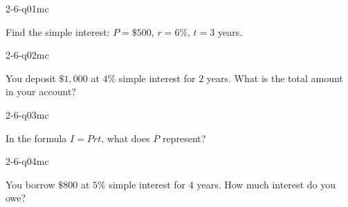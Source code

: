 

\begin{practiceQuestion}{2-6-q01}{mc}
\begin{questionText}
Find the simple interest: $P = \$500$, $r = 6\%$, $t = 3$ years.
\end{questionText}
\end{practiceQuestion}

\begin{practiceQuestion}{2-6-q02}{mc}
\begin{questionText}
You deposit $\$1{,}000$ at $4\%$ simple interest for $2$ years. What is the total amount in your account?
\end{questionText}
\end{practiceQuestion}

\begin{practiceQuestion}{2-6-q03}{mc}
\begin{questionText}
In the formula $I = Prt$, what does $P$ represent?
\end{questionText}
\end{practiceQuestion}

\begin{practiceQuestion}{2-6-q04}{mc}
\begin{questionText}
You borrow $\$800$ at $5\%$ simple interest for $4$ years. How much interest do you owe?
\end{questionText}
\end{practiceQuestion}

